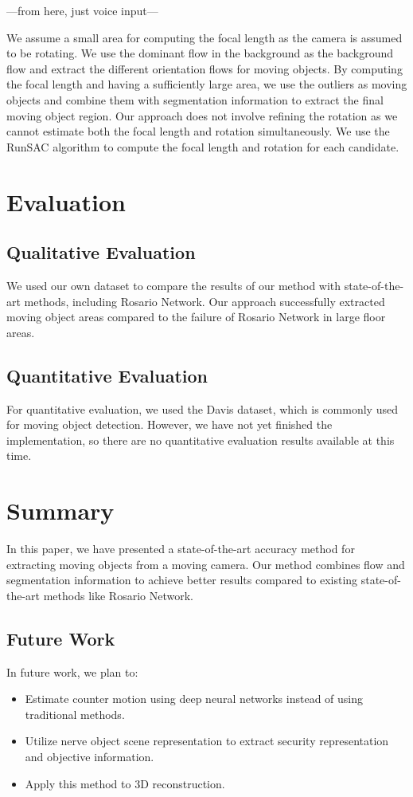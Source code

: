\documentclass[10pt, twocolumn]{article}
\begin{document}
---from here, just voice input---


We assume a small area for computing the focal length as the camera is assumed to be rotating.
We use the dominant flow in the background as the background flow and extract the different orientation flows for moving objects.
By computing the focal length and having a sufficiently large area, we use the outliers as moving objects and combine them with segmentation information to extract the final moving object region.
Our approach does not involve refining the rotation as we cannot estimate both the focal length and rotation simultaneously.
We use the RunSAC algorithm to compute the focal length and rotation for each candidate.


\section{Evaluation}

\subsection{Qualitative Evaluation}
We used our own dataset to compare the results of our method with state-of-the-art methods, including Rosario Network. Our approach successfully extracted moving object areas compared to the failure of Rosario Network in large floor areas.

\subsection{Quantitative Evaluation}
For quantitative evaluation, we used the Davis dataset, which is commonly used for moving object detection. However, we have not yet finished the implementation, so there are no quantitative evaluation results available at this time.


\section{Summary}
In this paper, we have presented a state-of-the-art accuracy method for extracting moving objects from a moving camera. Our method combines flow and segmentation information to achieve better results compared to existing state-of-the-art methods like Rosario Network.

\subsection{Future Work}
In future work, we plan to:

\begin{itemize}
  \item Estimate counter motion using deep neural networks instead of using traditional methods.
  \item Utilize nerve object scene representation to extract security representation and objective information.
  \item Apply this method to 3D reconstruction.
\end{itemize}



\end{document}
